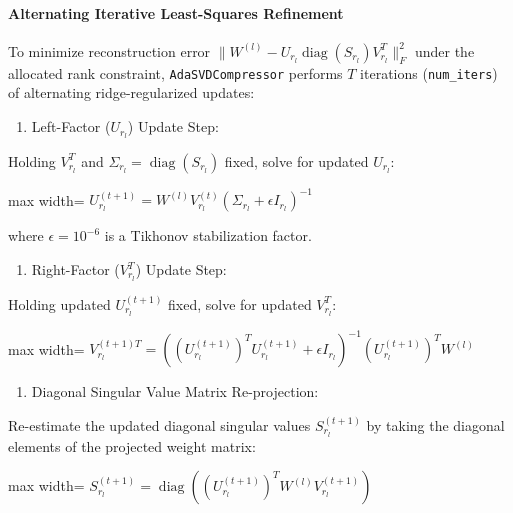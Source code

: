 \paragraph{Alternating Iterative Least-Squares Refinement}
To minimize reconstruction error $\|W^{(l)} - U_{r_l} \operatorname{diag}(S_{r_l}) V_{r_l}^T\|_F^2$ under the allocated rank constraint, \texttt{AdaSVDCompressor} performs $T$ iterations (\texttt{num\_iters}) of alternating ridge-regularized updates:

\begin{enumerate}
\item Left-Factor ($U_{r_l}$) Update Step:
\end{enumerate}
Holding $V_{r_l}^T$ and $\Sigma_{r_l} = \operatorname{diag}(S_{r_l})$ fixed, solve for updated $U_{r_l}$:

\begin{center}
\begin{adjustbox}{max width=\columnwidth}
$\displaystyle
U_{r_l}^{(t+1)} = W^{(l)} V_{r_l}^{(t)} \left( \Sigma_{r_l} + \epsilon I_{r_l} \right)^{-1}
$
\end{adjustbox}
\end{center}

where $\epsilon = 10^{-6}$ is a Tikhonov stabilization factor.

\begin{enumerate}
\item Right-Factor ($V_{r_l}^T$) Update Step:
\end{enumerate}
Holding updated $U_{r_l}^{(t+1)}$ fixed, solve for updated $V_{r_l}^T$:

\begin{center}
\begin{adjustbox}{max width=\columnwidth}
$\displaystyle
V_{r_l}^{(t+1)T} = \left( (U_{r_l}^{(t+1)})^T U_{r_l}^{(t+1)} + \epsilon I_{r_l} \right)^{-1} (U_{r_l}^{(t+1)})^T W^{(l)}
$
\end{adjustbox}
\end{center}

\begin{enumerate}
\item Diagonal Singular Value Matrix Re-projection:
\end{enumerate}
Re-estimate the updated diagonal singular values $S_{r_l}^{(t+1)}$ by taking the diagonal elements of the projected weight matrix:

\begin{center}
\begin{adjustbox}{max width=\columnwidth}
$\displaystyle
S_{r_l}^{(t+1)} = \operatorname{diag}\left( (U_{r_l}^{(t+1)})^T W^{(l)} V_{r_l}^{(t+1)} \right)
$
\end{adjustbox}
\end{center}

